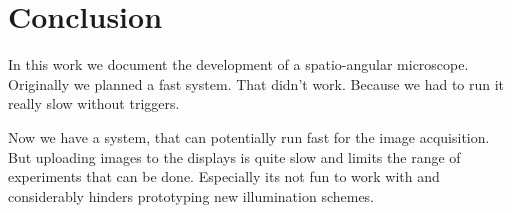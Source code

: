 \chapter{Conclusion}
In this work we document the development of a spatio-angular
microscope. Originally we planned a fast system. That didn't work.
Because we had to run it really slow without triggers.

Now we have a system, that can potentially run fast for the image
acquisition.  But uploading images to the displays is quite slow and
limits the range of experiments that can be done. Especially its not
fun to work with and considerably hinders prototyping new illumination
schemes.

